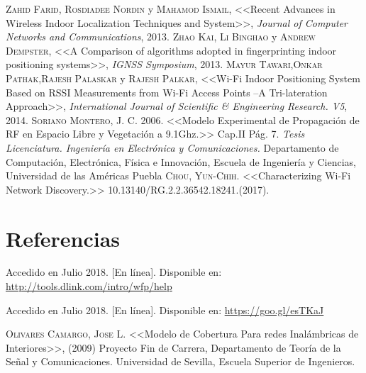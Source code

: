 \documentclass[letterpaper,oneside,12pt]{book}
\begin{document}
 \newpage
 
% 
\begin{thebibliography}{X}

 \textsc{Zahid Farid, Rosdiadee Nordin} y \textsc{Mahamod Ismail}, <<Recent Advances in Wireless Indoor Localization Techniques
and System>>, \textit{Journal of Computer Networks and Communications}, 2013.
 \textsc{Zhao Kai, Li Binghao} y \textsc{Andrew Dempster}, <<A Comparison of algorithms adopted in fingerprinting indoor positioning systems>>, \textit{IGNSS Symposium}, 2013.
 \textsc{Mayur Tawari},\textsc{Onkar Pathak},\textsc{Rajesh Palaskar} y \textsc{Rajesh Palkar}, <<Wi-Fi Indoor Positioning System
Based on RSSI Measurements from Wi-Fi Access Points –A Tri-lateration Approach>>, \textit{International Journal of Scientific \& Engineering Research. V5}, 2014.
 \textsc{Soriano Montero, J. C.} 2006. <<Modelo Experimental de Propagación de RF en Espacio Libre y Vegetación a 9.1Ghz.>> Cap.II Pág. 7.  \textit{Tesis Licenciatura. Ingeniería en Electrónica y Comunicaciones.} Departamento de Computación, Electrónica, Física e Innovación, Escuela de Ingeniería y Ciencias, Universidad de las Américas Puebla
 \textsc{Chou, Yun-Chih.} <<Characterizing Wi-Fi Network Discovery.>> 10.13140/RG.2.2.36542.18241.(2017).
\end{thebibliography}

\section{Referencias}
\begin{enumerate}[{[1]}]
\item{Accedido en Julio 2018. [En línea]. Disponible en: \url{http://tools.dlink.com/intro/wfp/help} \label{fig:prop}}
\item{Accedido en Julio 2018. [En línea]. Disponible en: \url{https://goo.gl/esTKaJ} \label{fig:paginaHP}}
\item{\textsc{Olivares Camargo, Jose L.} <<Modelo de Cobertura Para redes Inalámbricas de Interiores>>, (2009) Proyecto Fin de Carrera, Departamento de Teoría de la Señal y Comunicaciones. Universidad de Sevilla, Escuela Superior de Ingenieros.\label{pdf:1}}
\end{enumerate}


\end{document}
